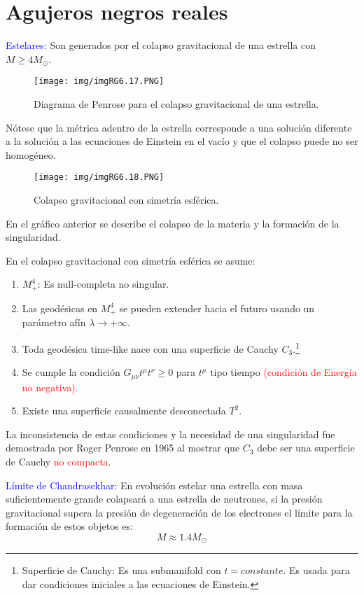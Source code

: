 \documentclass[../main]{subfiles}
\begin{document}
\section{Agujeros negros reales}

\textcolor{blue}{Estelares:} Son generados por el colapso gravitacional de una estrella con $M\geq 4 M_{\odot}$.
\begin{figure}[h]
    \centering
    \texttt{[image: img/imgRG6.17.PNG]}
    \caption{Diagrama de Penrose para el colapso gravitacional de una estrella.}
\end{figure}

Nótese que la métrica adentro de la estrella corresponde a una solución diferente a la solución a las ecuaciones de Einstein en el vacío y que el colapso puede no ser homogéneo.
\begin{figure}[h]
    \centering
    \texttt{[image: img/imgRG6.18.PNG]}
    \caption{Colapso gravitacional con simetría esférica.}
\end{figure}

En el gráfico anterior se describe el colapso de la materia y la formación de la singularidad.

En el colapso gravitacional con simetría esférica se asume:
\begin{enumerate}
    \item $M^4_+$: Es null-completa no singular.
    \item Las geodésicas en $M^4_+$ se pueden extender hacia el futuro usando un parámetro afín $\lambda \rightarrow + \infty$.
    \item Toda geodésica time-like nace con una superficie de Cauchy $C_3$.\footnote{Superficie de Cauchy: Es una submanifold con $t=constante$. Es usada para dar condiciones iniciales a las ecuaciones de Einstein.}
    \item Se cumple la condición $G_{\mu\nu}t^{\mu}t^{\nu}\geq 0$ para $t^{\mu}$ tipo tiempo \textcolor{red}{(condición de Energía no negativa).}
    \item Existe una superficie causalmente desconectada $T^2$.
\end{enumerate}

La inconsistencia de estas condiciones y la necesidad de una singularidad fue demostrada por Roger Penrose en 1965 al mostrar que $C_3$ debe ser una superficie de Cauchy \textcolor{red}{no compacta}.

\textcolor{blue}{Límite de Chandrasekhar:} En evolución estelar una estrella con masa suficientemente grande colapsará a una estrella de neutrones, sí la presión gravitacional supera la presión de degeneración de los electrones el límite para la formación de estos objetos es:
\begin{equation}
    M \approx 1.4M_{\odot}
\end{equation}
\end{document}
